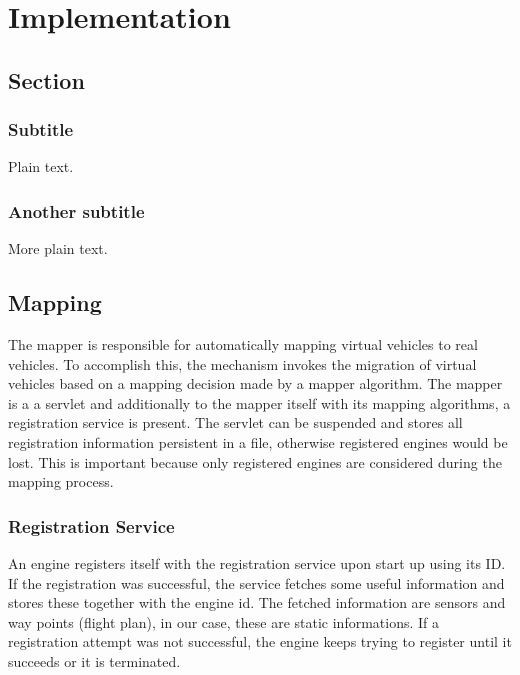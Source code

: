 
\chapter{Implementation}

\section{Section}

\subsection{Subtitle}

Plain text.

\subsection{Another subtitle}

More plain text.


\section{Mapping}
The mapper is responsible for automatically mapping virtual vehicles to real vehicles. To accomplish this, the mechanism invokes 
the migration of virtual vehicles based on a mapping decision made by a mapper algorithm. The mapper is a a servlet and additionally 
to the mapper itself with its mapping algorithms, a registration service is present. The servlet can be suspended and stores all
registration information persistent in a file, otherwise registered engines would be lost. This is important because only registered 
engines are considered during the mapping process.
\\
\subsection{Registration Service}
An engine registers itself with the registration service upon start up using its ID. If the registration was successful, the service
fetches some useful information and stores these together with the engine id. The fetched information are sensors and 
way points (flight plan), in our case, these are static informations. If a registration attempt was not successful, the engine 
keeps trying to register until it succeeds or it is terminated.

